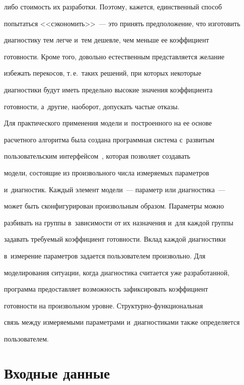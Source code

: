 либо стоимость их разработки. Поэтому, кажется, единственный способ 


попытаться <<сэкономить>>~--- это принять предположение, что изготовить 


диагностику тем легче и~тем дешевле, чем меньше ее коэффициент 


готовности. Кроме того, довольно естественным представляется желание 


избежать перекосов, т.\,е.\ таких решений, при которых некоторые 


диагностики будут иметь предельно высокие значения коэффициента 


готовности, а~другие, наоборот, допускать частые отказы.





Для практического применения модели и~по\-стро\-ен\-но\-го на ее основе 


расчетного алгоритма была создана программная сис\-те\-ма с~развитым 


пользовательским интерфейсом~\cite{8-kn}, которая поз\-во\-ля\-ет создавать 


модели, со\-сто\-ящие из произвольного чис\-ла из\-ме\-ря\-емых па\-ра\-мет\-ров 


и~диагностик. Каждый элемент модели~--- параметр или диагностика~--- 


может быть сконфигурирован произвольным образом. Параметры можно 


разбивать на группы в~за\-ви\-си\-мости от их назначения и~для каждой группы 


задавать тре\-бу\-емый коэффициент го\-тов\-ности. Вклад каж\-дой диагностики 


в~измерение па\-ра\-мет\-ров задается пользователем произвольно. Для 


моделирования ситуации, когда диагностика считается уже разработанной, 


программа предостав\-ля\-ет воз\-мож\-ность зафиксировать коэффициент 


го\-тов\-ности на произвольном уровне. Струк\-тур\-но-функ\-цио\-наль\-ная 


связь меж\-ду измеряемыми па\-ра\-мет\-ра\-ми и~диагностиками так\-же определяется 


пользователем.





\section{Входные данные}





